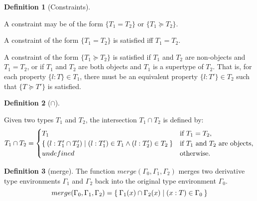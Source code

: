 \documentclass[a4paper]{article}
\theoremstyle{definition}
\newtheorem{definition}{Definition}[section]
\theoremstyle{dotless}
\begin{document}
\begin{definition}[Constraints]\label{constraintsDefn}

  A constraint may be of the form $\{T_1 = T_2\}$ or $\{T_1 \succeq T_2\}$.

  A constraint of the form $\{T_1 = T_2\}$ is satisfied iff $T_1 = T_2$.

  A constraint of the form $\{T_1 \succeq T_2\}$ is satisfied if $T_1$ and
  $T_2$ are non-objects and $T_1 = T_2$, or if $T_1$ and $T_2$ are both
  objects and $T_1$ is a supertype of $T_2$. That is, for each property
  $\{l:T\} \in T_1$, there must be an equivalent property $\{l: T'\} \in T_2$ such
  that $\{T \succeq T'\}$ is satisfied.

\end{definition}

\begin{definition}[$\cap$]\label{typeIntersect}

  Given two types $T_1$ and $T_2$, the intersection $T_1\cap T_2$ is defined by:
  \begin{equation}\label{intersect-eqn}
  	T_1\cap T_2 = 
  	\begin{cases}
  	  T_1 & \text{if $T_1 = T_2$}, \\
  	  \Set{(l:T_1'\cap T_2') | (l:T_1') \in T_1 \land (l:T_2') \in T_2} & \text{if $T_1$ and $T_2$ are objects}, \\
  	  undefined & \text{otherwise.}
  	\end{cases}
  \end{equation}

\end{definition}

\begin{definition}[merge]\label{merge}
  The function $merge(\Gamma_0, \Gamma_1, \Gamma_2)$ merges two derivative type environments $\Gamma_1$ and $\Gamma_2$ back into the original type environment $\Gamma_0$.
  \begin{equation} \label{merge-eqn}
	merge (\Gamma_0, \Gamma_1, \Gamma_2) = \Set{ \Gamma_1(x) \cap \Gamma_2(x) | (x: T) \in \Gamma_0 }
  \end{equation}
\end{definition}
\end{document}
